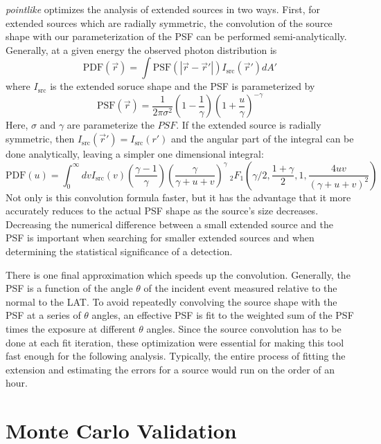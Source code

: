 \documentclass[12pt]{article}
\begin{document}
{\em pointlike} optimizes the analysis of extended sources in two ways.
First, for extended sources which are radially symmetric, the convolution
of the source shape with our parameterization of the PSF can be performed
semi-analytically. Generally, at a given energy the observed 
photon distribution is
\begin{equation}
  \text{PDF}(\vec r) = \int  \text{PSF}(|\vec r - \vec r'|)I_\text{src}(\vec r') d A' 
\end{equation}
where $I_\text{src}$ is the extended soruce shape and the PSF is parameterized by
\begin{equation}
  \text{PSF}(\vec r) = 
  \frac{1}{2\pi\sigma^2}
  \left(1-\frac{1}{\gamma}\right)
  \left(1+\frac{u}{\gamma}\right)^{-\gamma}
\end{equation}
Here, $\sigma$ and $\gamma$ are parameterize the $PSF$.
If the extended source is radially symmetric, then
$I_\text{src} (\vec r') = I_\text{src} (r')$ and the angular part of the
integral can be done analytically, leaving a simpler one dimensional
integral:
\begin{equation}
  \text{PDF}(u)= \int_0^\infty dv
  I_\text{src}(v) 
  \left(\frac{\gamma-1}{\gamma}\right)
  \left( \frac{\gamma}{\gamma + u + v}\right)^\gamma
  ~_2F_1 \left(\gamma/2,\frac{1+\gamma}{2},1,\frac{4uv}{(\gamma+u+v)^2}\right)
\end{equation}
Not only is this convolution formula faster, but it has the advantage
that it more accurately reduces to the actual PSF shape as the source's
size decreases.  Decreasing the numerical difference between a small extended
source and the PSF is important when searching for smaller extended sources
and when determining the statistical significance of a detection.

There is one final approximation which speeds up the convolution.
Generally, the PSF is a function of the angle $\theta$ of the incident
event measured relative to the normal to the LAT. To avoid repeatedly
convolving the source shape with the PSF at a series of $\theta$ angles,
an effective PSF is fit to the weighted sum of the PSF times the exposure
at different $\theta$ angles.  Since the source convolution has to be
done at each fit iteration, these optimization were essential for making
this tool fast enough for the following analysis. Typically, the entire
process of fitting the extension and estimating the errors for a source
would run on the order of an hour.

\section{Monte Carlo Validation}
\end{document}
